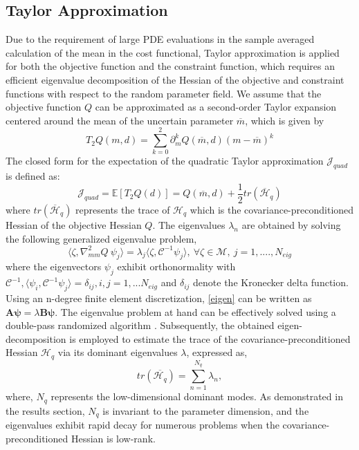 \documentclass[pdf-a,balance,colorlinks,upint,subscriptcorrection,varvw,mathalfa=cal=boondoxo, spanish,french,vietnamese,russian,greek]{asmeconf}
\begin{document}
\subsection{Taylor Approximation}
\noindent
Due to the requirement of large PDE evaluations in the sample averaged calculation of the mean in the cost functional, Taylor approximation is applied for both the objective function and the constraint function, which requires an efficient eigenvalue decomposition of the Hessian of the objective and constraint functions with respect to the random parameter field.
We assume that the objective function $Q$ can be approximated as a second-order Taylor expansion centered around the mean of the uncertain parameter $\overline{m}$, which is given by
\begin{equation}
    T_{2} Q(m,d) = \sum_{k=0}^2 \partial_{m}^k Q(\overline{m},d) (m - \overline{m})^{k}
\end{equation}
The closed form for the expectation of the quadratic Taylor approximation $\mathcal{J}_{quad}$ is defined as:
\begin{equation}\label{eq:taylor objective}
    \mathcal{J}_{quad} = \mathbb{E}[T_2 Q(d)] = Q(\overline{m},d) + \frac{1}{2} tr(\overline{\mathcal{H}}_q)
\end{equation}
where $tr(\overline{\mathcal{H}}_q)$ represents the trace of $\mathcal{H}_{q}$ which is the covariance-preconditioned Hessian of the objective Hessian $Q$. The eigenvalues $\lambda_n$ are obtained by solving the following generalized eigenvalue problem,
\begin{equation} \label{eigen}
    \langle \zeta, \nabla^{2}_{mm}Q \: \psi_j \rangle = \lambda_j \langle \zeta, \mathcal{C}^{-1} \psi_j \rangle, \: \forall \zeta \in \mathcal{M},\: j = 1,....,N_{eig} 
\end{equation}
where the eigenvectors $\psi_j$ exhibit orthonormality with $\mathcal{C}^{-1}, \langle \psi_i, \mathcal{C}^{-1} \psi_j \rangle = \delta_{ij},i,j = 1,...N_{eig}$ and $\delta_{ij}$ denote the Kronecker delta function. 
Using an n-degree finite element discretization, \ref{eigen} can be written as $\boldsymbol{A \psi =} \lambda \boldsymbol{B \psi}$. 
%
The eigenvalue problem at hand can be effectively solved using a double-pass randomized algorithm \cite{Saibaba}. Subsequently, the obtained eigen-decomposition is employed to estimate the trace of the covariance-preconditioned Hessian $\mathcal{H}_q$ via its dominant eigenvalues $\lambda$, expressed as,
\begin{equation}
        tr(\overline{\mathcal{H}_q}) = \sum_{n=1}^{N_q} \lambda_{n},
\end{equation}
where, $N_{q}$ represents the low-dimensional dominant modes. As demonstrated in the results section, $N_{q}$ is invariant to the parameter dimension, and the eigenvalues exhibit rapid decay for numerous problems when the covariance-preconditioned Hessian is low-rank.
\end{document}
